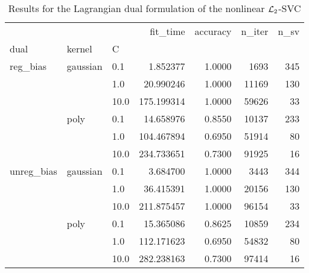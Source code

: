 \begin{table}[H]
\centering
\caption{Results for the Lagrangian dual formulation of the nonlinear $\protect \mathcal{L}_2$-SVC}
\label{nonlinear_lagrangian_dual_l2_svc_cv_results}
\begin{tabular}{lllrrrr}
\toprule
           &      &      &    fit\_time &  accuracy &  n\_iter &  n\_sv \\
dual & kernel & C &             &           &         &       \\
\midrule
reg\_bias & gaussian & 0.1  &    1.852377 &    1.0000 &    1693 &   345 \\
           &      & 1.0  &   20.990246 &    1.0000 &   11169 &   130 \\
           &      & 10.0 &  175.199314 &    1.0000 &   59626 &    33 \\
           & poly & 0.1  &   14.658976 &    0.8550 &   10137 &   233 \\
           &      & 1.0  &  104.467894 &    0.6950 &   51914 &    80 \\
           &      & 10.0 &  234.733651 &    0.7300 &   91925 &    16 \\
unreg\_bias & gaussian & 0.1  &    3.684700 &    1.0000 &    3443 &   344 \\
           &      & 1.0  &   36.415391 &    1.0000 &   20156 &   130 \\
           &      & 10.0 &  211.875457 &    1.0000 &   96154 &    33 \\
           & poly & 0.1  &   15.365086 &    0.8625 &   10859 &   234 \\
           &      & 1.0  &  112.171623 &    0.6950 &   54832 &    80 \\
           &      & 10.0 &  282.238163 &    0.7300 &   97414 &    16 \\
\bottomrule
\end{tabular}
\end{table}
